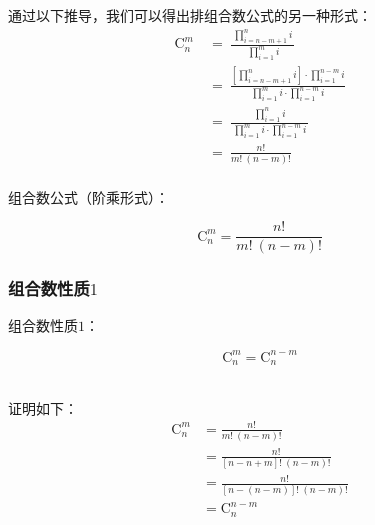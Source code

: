 \documentclass[UTF8]{ctexart}
\begin{document}
\newpage

    通过以下推导，我们可以得出排组合数公式的另一种形式：\vspace{5pt}
    \setcounter{equation}{0}
    \begin{align}
        \mathrm{C}_n^m~
        &=~\frac{~\prod\limits_{i=n-m+1}^{n}i~}{\,\prod\limits_{i=1}^{m}i}\\[4mm]
        &=~\frac{\left[\prod\limits_{i=n-m+1}^n i\right]\cdot\prod\limits_{i=1}^{n-m} i}{\prod\limits_{i=1}^{m}i\cdot\prod\limits_{i=1}^{n-m} i}\\[4mm]
        &=~\frac{\prod\limits_{i=1}^{n}i}{~\prod\limits_{i=1}^{m}i\cdot\prod\limits_{i=1}^{n-m} i~}\\[4mm]
        &=~\frac{n!}{m!~(n-m)!}
    \end{align}\\
    组合数公式（阶乘形式）：
    \begin{large}
        \begin{equation*}
            \mathrm{C}_n^m=\frac{n!}{m!~(n-m)!}
        \end{equation*}
    \end{large}

\subsubsection{组合数性质$1$}
    组合数性质$1$：
    \begin{large}
        \begin{equation*}
            \mathrm{C}_{n}^{m}=\mathrm{C}_{n}^{n-m}
        \end{equation*}
    \end{large}\\
    证明如下：
    \setcounter{equation}{0}
    \begin{align}
        \mathrm{C}_n^m
        &=\frac{n!}{m!~(n-m)!}\\[3mm]
        &=\frac{n!}{\left[n-n+m\right]!~(n-m)!}\\[3mm]
        &=\frac{n!}{\left[n-(n-m)\right]!~(n-m)!}\\[3mm]
        &=\mathrm{C}_{n}^{n-m}
    \end{align}

\newpage
\end{document}
